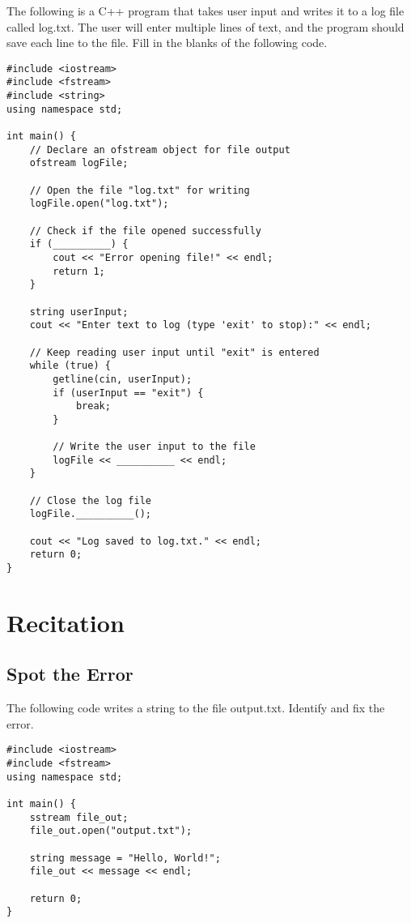 \begin{problem}
The following is a C++ program that takes user input and writes it to a log file called log.txt. The user will enter multiple lines of text, and the program should save each line to the file. Fill in the blanks of the following code.

\begin{verbatim}
#include <iostream>
#include <fstream>
#include <string>
using namespace std;

int main() {
    // Declare an ofstream object for file output
    ofstream logFile;

    // Open the file "log.txt" for writing
    logFile.open("log.txt");

    // Check if the file opened successfully
    if (__________) {
        cout << "Error opening file!" << endl;
        return 1;
    }

    string userInput;
    cout << "Enter text to log (type 'exit' to stop):" << endl;

    // Keep reading user input until "exit" is entered
    while (true) {
        getline(cin, userInput);
        if (userInput == "exit") {
            break;
        }

        // Write the user input to the file
        logFile << __________ << endl;
    }

    // Close the log file
    logFile.__________();

    cout << "Log saved to log.txt." << endl;
    return 0;
}
\end{verbatim}
\end{problem}
\newpage

\section{Recitation}
\subsection{Spot the Error}
\begin{multipart}
The following code writes a string to the file output.txt. Identify and fix the error.
\end{multipart}

\begin{verbatim}
#include <iostream>
#include <fstream>
using namespace std;

int main() {
    sstream file_out;
    file_out.open("output.txt");

    string message = "Hello, World!";
    file_out << message << endl;

    return 0;
}

\end{verbatim}


